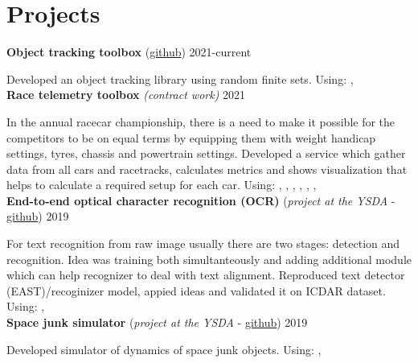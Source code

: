 \section*{\sectionformat Projects}
\textbf{Object tracking toolbox} (\href{https://github.com/neer201/Multi-Object-Tracking-for-Automotive-Systems-in-python}{github}) \hfill 2021-current
\par
Developed an object tracking library using random finite sets.
Using: , 
\\
% 
\textbf{Race telemetry toolbox} \textit{(contract work)} \hfill 2021
\par
In the annual racecar championship, there is a need to make it possible for the competitors to be on equal terms by equipping them with weight handicap settings, tyres, chassis and powertrain settings.
Developed a service which gather data from all cars and racetracks, calculates metrics and shows visualization that helps to calculate a required setup for each car.
Using: , , , , , , 
\\
\textbf{End-to-end optical character recognition (OCR)} (\textit{project at the YSDA} - \href{https://github.com/neer201/end2end_OCR}{github})  \hfill 2019
\par
For text recognition from raw image usually there are two stages: detection and recognition. Idea was training both simultanteously and adding additional module which can help recognizer to deal with text alignment.
Reproduced text detector (EAST)/recoginizer model, appied ideas and validated it on ICDAR dataset.
Using: , 
% 
\\
\textbf{Space junk simulator} (\textit{project at the YSDA} - \href{https://github.com/neer201/space_junk_simulator}{github})   \hfill 2019
\par
Developed simulator of dynamics of space junk objects.
Using: , 
